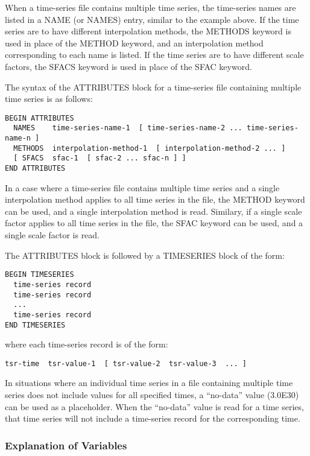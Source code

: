 When a time-series file contains multiple time series, the time-series names are listed in a NAME (or NAMES) entry, similar to the example above. If the time series are to have different interpolation methods, the METHODS keyword is used in place of the METHOD keyword, and an interpolation method corresponding to each name is listed. If the time series are to have different scale factors, the SFACS keyword is used in place of the SFAC keyword. 

The syntax of the ATTRIBUTES block for a time-series file containing multiple time series is as follows:

\begin{lstlisting}[style=blockdefinition]
BEGIN ATTRIBUTES
  NAMES    time-series-name-1  [ time-series-name-2 ... time-series-name-n ]
  METHODS  interpolation-method-1  [ interpolation-method-2 ... ]
  [ SFACS  sfac-1  [ sfac-2 ... sfac-n ] ]
END ATTRIBUTES
\end{lstlisting}

In a case where a time-series file contains multiple time series and a single interpolation method applies to all time series in the file, the METHOD keyword can be used, and a single interpolation method is read. Similary, if a single scale factor applies to all time series in the file, the SFAC keyword can be used, and a single scale factor is read.

The ATTRIBUTES block is followed by a TIMESERIES block of the form:
\begin{lstlisting}[style=blockdefinition]
BEGIN TIMESERIES
  time-series record
  time-series record
  ...
  time-series record
END TIMESERIES
\end{lstlisting}

\noindent where each time-series record is of the form:\\
\begin{lstlisting}[style=blockdefinition]
  tsr-time  tsr-value-1  [ tsr-value-2  tsr-value-3  ... ]
\end{lstlisting}

In situations where an individual time series in a file containing multiple time series does not include values for all specified times, a ``no-data'' value (3.0E30) can be used as a placeholder. When the ``no-data'' value is read for a time series, that time series will not include a time-series record for the corresponding time.

\subsubsection{Explanation of Variables}

